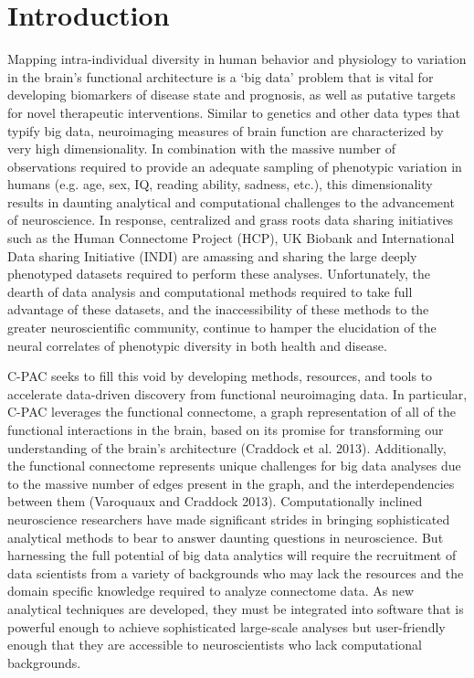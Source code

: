 \section{Introduction}
\label{intro}

Mapping intra-individual diversity in human behavior and physiology to variation in the brain’s functional architecture is a ‘big data’ problem that is vital for developing biomarkers of disease state and prognosis, as well as putative targets for novel therapeutic interventions. Similar to genetics and other data types that typify big data, neuroimaging measures of brain function are characterized by very high dimensionality. In combination with the massive number of observations required to provide an adequate sampling of phenotypic variation in humans (e.g. age, sex, IQ, reading ability, sadness, etc.), this dimensionality results in daunting analytical and computational challenges to the advancement of neuroscience. In response, centralized and grass roots data sharing initiatives such as the Human Connectome Project (HCP), UK Biobank and International Data sharing Initiative (INDI) are amassing and sharing the large deeply phenotyped datasets required to perform these analyses. Unfortunately, the dearth of data analysis and computational methods required to take full advantage of these datasets, and the inaccessibility of these methods to the greater neuroscientific community, continue to hamper the elucidation of the neural correlates of phenotypic diversity in both health and disease.

C-PAC seeks to fill this void by developing methods, resources, and tools to accelerate data-driven discovery from functional neuroimaging data. In particular, C-PAC leverages the functional connectome, a graph representation of all of the functional interactions in the brain, based on its promise for transforming our understanding of the brain’s architecture (Craddock et al. 2013). Additionally, the functional connectome represents unique challenges for big data analyses due to the massive number of edges present in the graph, and the interdependencies between them (Varoquaux and Craddock 2013). Computationally inclined neuroscience researchers have made significant strides in bringing sophisticated analytical methods to bear to answer daunting questions in neuroscience. But harnessing the full potential of big data analytics will require the recruitment of data scientists from a variety of backgrounds who may lack the resources and the domain specific knowledge required to analyze connectome data. As new analytical techniques are developed, they must be integrated into software that is powerful enough to achieve sophisticated large-scale analyses but user-friendly enough that they are accessible to neuroscientists who lack computational backgrounds.

